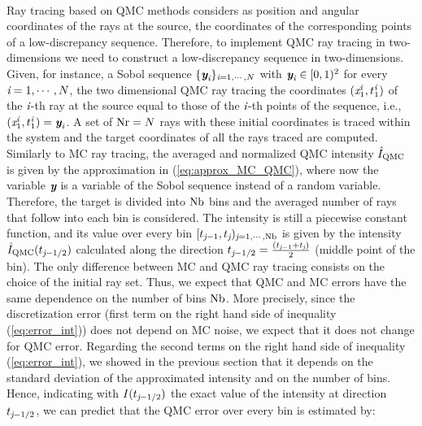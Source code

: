 \\ \indent Ray tracing based on QMC methods considers as position and angular coordinates of the rays at the source, the coordinates of the corresponding points of a low-discrepancy sequence. 
Therefore, to implement QMC ray tracing in two-dimensions we need to construct a low-discrepancy sequence in two-dimensions.  
Given, for instance, a Sobol sequence $\{\textit{\textbf{y}}_{\textit{i}}\}_{\textit{i}=1, \cdots, N}$ with $\textit{\textbf{y}}_{\textit{i}}\in[0,1)^2$ for every $\textit{i}=1, \cdots, N$, the two dimensional QMC ray tracing the coordinates $(\textit{x}_1^{\textit{i}}, t_1^{\textit{i}})$ of the $\textit{i}$-th ray at the source equal to those of the $\textit{i}$-th points of the sequence, i.e., $(\textit{x}_1^{\textit{i}}, t_1^{\textit{i}})=\textit{\textbf{y}}_{\textit{i}}$. A set of $\textrm{Nr} = N$ rays with these initial coordinates is traced within the system and the target coordinates of all the rays traced are computed. \\ \indent 
Similarly to MC ray tracing, the averaged and normalized QMC intensity $\hat{I}_{\textrm{QMC}}$ is given by the approximation in (\ref{eq:approx_MC_QMC}), where now the variable $\textit{\textbf{y}}$ is a variable of the Sobol sequence instead of a random variable. Therefore, the target is divided into $\textrm{Nb}$ bins and the averaged number of rays that follow into each bin is considered. The intensity is still a piecewise constant function, and its value over every bin $[t_{\textit{j}-1}, t_{\textit{j}})_{\textit{j}=1, \cdots, \textrm{Nb}}$ is given by the intensity $\hat{I}_{\textrm{QMC}}(t_{\textit{j}-1/2})$ calculated along the direction $t_{\textit{j}-1/2} = \frac{(t_{\textit{j}-1}+t_{\textit{j}})}{2}$ (middle point of the bin). The only difference between MC and QMC ray tracing consists on the choice of the initial ray set. Thus, we expect that QMC and MC errors have the same dependence on the number of bins $\textrm{Nb}$. More precisely, since the discretization error (first term on the right hand side of inequality (\ref{eq:error_int})) does not depend on MC noise, we expect that it does not change for QMC error. Regarding the second terms on the right hand side of inequality (\ref{eq:error_int}), we showed in the previous section that it depends on the standard deviation of the approximated intensity and on the number of bins. Hence, indicating with $I(t_{\textit{j}-1/2})$ the exact value of the intensity at direction $t_{\textit{j}-1/2}$, we can predict that the QMC error over every bin is estimated by:
